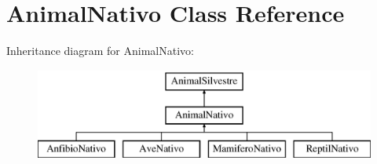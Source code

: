 \hypertarget{class_animal_nativo}{}\section{Animal\+Nativo Class Reference}
\label{class_animal_nativo}
Inheritance diagram for Animal\+Nativo\+:\begin{figure}[H]
\begin{center}
\leavevmode
\includegraphics[height=3.000000cm]{class_animal_nativo}
\end{center}
\end{figure}

